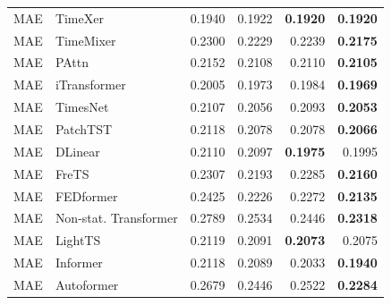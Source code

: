 \begin{longtable}{llrrrr}
\midrule
MAE & TimeXer & 0.1940 & 0.1922 & \textbf{0.1920} & \textbf{0.1920} \\
MAE & TimeMixer & 0.2300 & 0.2229 & 0.2239 & \textbf{0.2175} \\
MAE & PAttn & 0.2152 & 0.2108 & 0.2110 & \textbf{0.2105} \\
MAE & iTransformer & 0.2005 & 0.1973 & 0.1984 & \textbf{0.1969} \\
MAE & TimesNet & 0.2107 & 0.2056 & 0.2093 & \textbf{0.2053} \\
MAE & PatchTST & 0.2118 & 0.2078 & 0.2078 & \textbf{0.2066} \\
MAE & DLinear & 0.2110 & 0.2097 & \textbf{0.1975} & 0.1995 \\
MAE & FreTS & 0.2307 & 0.2193 & 0.2285 & \textbf{0.2160} \\
MAE & FEDformer & 0.2425 & 0.2226 & 0.2272 & \textbf{0.2135} \\
MAE & Non-stat. Transformer & 0.2789 & 0.2534 & 0.2446 & \textbf{0.2318} \\
MAE & LightTS & 0.2119 & 0.2091 & \textbf{0.2073} & 0.2075 \\
MAE & Informer & 0.2118 & 0.2089 & 0.2033 & \textbf{0.1940} \\
MAE & Autoformer & 0.2679 & 0.2446 & 0.2522 & \textbf{0.2284} \\
\end{longtable}
\endgroup

